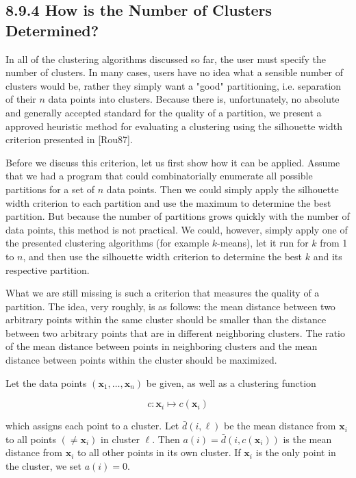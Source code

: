\documentclass[10pt]{book}
\begin{document}
\begin{center}
\begin{enumerate}
\begin{center}
\begin{center}
\begin{center}
\subsection*{8.9.4 How is the Number of Clusters Determined?}
In all of the clustering algorithms discussed so far, the user must specify the number of clusters. In many cases, users have no idea what a sensible number of clusters would be, rather they simply want a "good" partitioning, i.e. separation of their $n$ data points into clusters. Because there is, unfortunately, no absolute and generally accepted standard for the quality of a partition, we present a approved heuristic method for evaluating a clustering using the silhouette width criterion presented in [Rou87].

Before we discuss this criterion, let us first show how it can be applied. Assume that we had a program that could combinatorially enumerate all possible partitions for a set of $n$ data points. Then we could simply apply the silhouette width criterion to each partition and use the maximum to determine the best partition. But because the number of partitions grows quickly with the number of data points, this method is not practical. We could, however, simply apply one of the presented clustering algorithms (for example $k$-means), let it run for $k$ from 1 to $n$, and then use the silhouette width criterion to determine the best $k$ and its respective partition.

What we are still missing is such a criterion that measures the quality of a partition. The idea, very roughly, is as follows: the mean distance between two arbitrary points within the same cluster should be smaller than the distance between two arbitrary points that are in different neighboring clusters. The ratio of the mean distance between points in neighboring clusters and the mean distance between points within the cluster should be maximized.

Let the data points $\left(\boldsymbol{x}_{1}, \ldots, \boldsymbol{x}_{n}\right)$ be given, as well as a clustering function

$$
c: \boldsymbol{x}_{i} \mapsto c\left(\boldsymbol{x}_{i}\right)
$$

which assigns each point to a cluster. Let $\bar{d}(i, \ell)$ be the mean distance from $\boldsymbol{x}_{i}$ to all points $\left(\neq \boldsymbol{x}_{i}\right)$ in cluster $\ell$. Then $a(i)=\bar{d}\left(i, c\left(\boldsymbol{x}_{i}\right)\right)$ is the mean distance from $\boldsymbol{x}_{i}$ to all other points in its own cluster. If $\boldsymbol{x}_{i}$ is the only point in the cluster, we set $a(i)=0$.


\end{center}
\end{center}
\end{center}
\end{enumerate}
\end{center}
\end{document}
